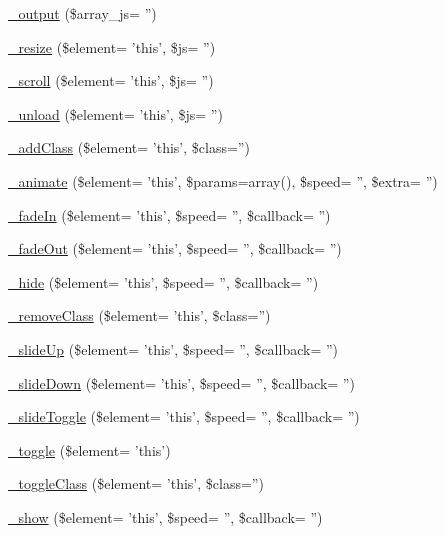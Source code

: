 \begin{DoxyCompactItemize}
\item 
\hyperlink{class_c_i___jquery_ad428c3d34a315b35dee449cee92b3100}{\-\_\-output} (\$array\-\_\-js= '')
\item 
\hyperlink{class_c_i___jquery_a4baae3a09859adaddeb8fcc7a2ed8386}{\-\_\-resize} (\$element= 'this', \$js= '')
\item 
\hyperlink{class_c_i___jquery_a421a3d5a5bf8a2d8a05a052069b40088}{\-\_\-scroll} (\$element= 'this', \$js= '')
\item 
\hyperlink{class_c_i___jquery_a59807618bf76c97f6c0472f876051b60}{\-\_\-unload} (\$element= 'this', \$js= '')
\item 
\hyperlink{class_c_i___jquery_a6143e9ffed97203ec75be9f218940802}{\-\_\-add\-Class} (\$element= 'this', \$class='')
\item 
\hyperlink{class_c_i___jquery_af2bf0a3a184a09ace21405af7eb8fc9b}{\-\_\-animate} (\$element= 'this', \$params=array(), \$speed= '', \$extra= '')
\item 
\hyperlink{class_c_i___jquery_a73933d1d9b7b750a61c77f6e45ca9b05}{\-\_\-fade\-In} (\$element= 'this', \$speed= '', \$callback= '')
\item 
\hyperlink{class_c_i___jquery_a89f60fad5c0220845cf2743babc41274}{\-\_\-fade\-Out} (\$element= 'this', \$speed= '', \$callback= '')
\item 
\hyperlink{class_c_i___jquery_a91aa704c8ee42c85a8b00c8ada3cf6e1}{\-\_\-hide} (\$element= 'this', \$speed= '', \$callback= '')
\item 
\hyperlink{class_c_i___jquery_afc0913e4918cdb0eb2c7f396a953c5ad}{\-\_\-remove\-Class} (\$element= 'this', \$class='')
\item 
\hyperlink{class_c_i___jquery_a49a5d411e18779882275485c45592401}{\-\_\-slide\-Up} (\$element= 'this', \$speed= '', \$callback= '')
\item 
\hyperlink{class_c_i___jquery_ad14a0700a81c5389643119cd37f4ada3}{\-\_\-slide\-Down} (\$element= 'this', \$speed= '', \$callback= '')
\item 
\hyperlink{class_c_i___jquery_a04a1e624ff3e37151a87b048b40bb8e1}{\-\_\-slide\-Toggle} (\$element= 'this', \$speed= '', \$callback= '')
\item 
\hyperlink{class_c_i___jquery_aafcbe892decebcbd0d13f4466f005f7a}{\-\_\-toggle} (\$element= 'this')
\item 
\hyperlink{class_c_i___jquery_a7516d9294668fa2c1f2bf4038089da57}{\-\_\-toggle\-Class} (\$element= 'this', \$class='')
\item 
\hyperlink{class_c_i___jquery_a631e07b830a14ee82ae2e5301a8dc59a}{\-\_\-show} (\$element= 'this', \$speed= '', \$callback= '')

\end{DoxyCompactItemize}
